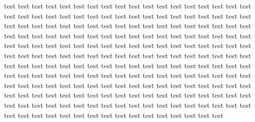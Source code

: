 \documentclass[10pt,journal,compsoc, twoside]{IEEEtran}
\begin{document}
test test test test test test test test test test test test test test test test test test test test test test test test test test test test test test test test test test test test test test test test test test test test test test test test test test test test test test test test test test test test test test test test test test test test test test test test test test test test test test test test test test test test test test test test test test test test test test test test test test test test test test test test test test test test test test test test test test test test test test test test test test test test test test test test test test test test test test test test test test test test test test test test test test test test test test test test test test test test test test test test test test test test test test test test test test test test test test test test test test test test test test test test test test test test test test test test test test test test test test test test test test test test test test test test test test test test test test 
\ifCLASSOPTIONcaptionsoff
  \newpage
\fi





\vspace{240pt}
\end{document}
